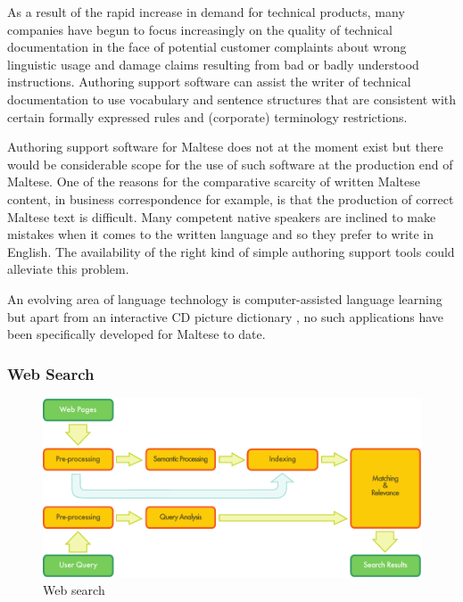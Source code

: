 \documentclass[]{../../metanetpaper}
\begin{document}
\begin{multicols}{2}
As a result of the rapid increase in demand for technical products, many companies have begun to focus increasingly on the quality of technical documentation in the face of potential customer complaints about wrong linguistic usage and damage claims resulting from bad or badly understood instructions. Authoring support software can assist the writer of technical documentation to use vocabulary and sentence structures that are consistent with certain formally expressed rules and (corporate) terminology restrictions.

Authoring support software for Maltese does not at the moment exist but there would be considerable scope for the use of such software at the production end of Maltese. One of the reasons for the comparative scarcity of written Maltese content, in business correspondence for example, is that the production of correct Maltese text is difficult. Many competent native speakers are inclined to make mistakes when it comes to the written language and so they prefer to write in English. The availability of the right kind of simple authoring support tools could alleviate this problem.

An evolving area of language technology is computer-assisted language learning but apart from an interactive CD picture dictionary \cite{Sciriha:1997}, no such applications have been specifically developed for Maltese to date.


\subsubsection{Web Search}

\begin{figure}[htb]
  \center
  \includegraphics[width=\textwidth]{../_media/english/web_search_architecture}
  \caption{Web search}
  \label{fig:websearcharch_en}
 \end{figure}


\end{multicols}
\end{document}

